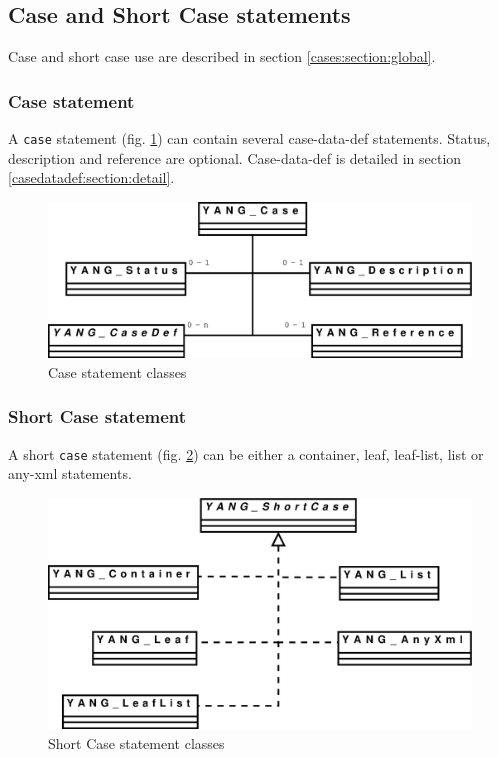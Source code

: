 \documentclass[a4paper]{article}
\begin{document}
\subsection{Case and Short Case statements}
\label{cases:section:detail}

Case and short case use are described in section \ref{cases:section:global}.

\subsubsection{Case statement}
\label{casedatadef:section:global}

A  {\tt  case}  statement   (fig.   \ref{case})  can  contain  several
case-data-def  statements.   Status,  description  and  reference  are
optional.       Case-data-def     is      detailed      in     section
\ref{casedatadef:section:detail}.
\begin{figure}[htbp]
\begin{center}
\includegraphics[scale = .3]{case.eps}
\end{center}
\caption{Case statement classes}
\label{case}
\end{figure}

\subsubsection{Short Case statement}
A short  {\tt case} statement  (fig. \ref{shortcase}) can be  either a
container, leaf, leaf-list, list or any-xml statements.
\begin{figure}[htbp]
\begin{center}
\includegraphics[scale = .3]{shortcase.eps}
\end{center}
\caption{Short Case statement classes}
\label{shortcase}
\end{figure}
\end{document}
